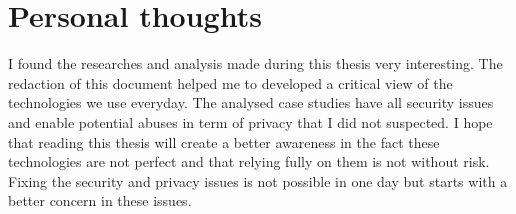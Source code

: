 \section{Personal thoughts}

I found the researches and analysis made during this thesis very interesting.
The redaction of this document helped me to developed a critical view of the technologies we use everyday.
The analysed case studies have all security issues and enable potential abuses in term of privacy that I did not suspected.
I hope that reading this thesis will create a better awareness in the fact these technologies are not perfect and that relying fully on them is not without risk.
Fixing the security and privacy issues is not possible in one day but starts with a better concern in these issues.